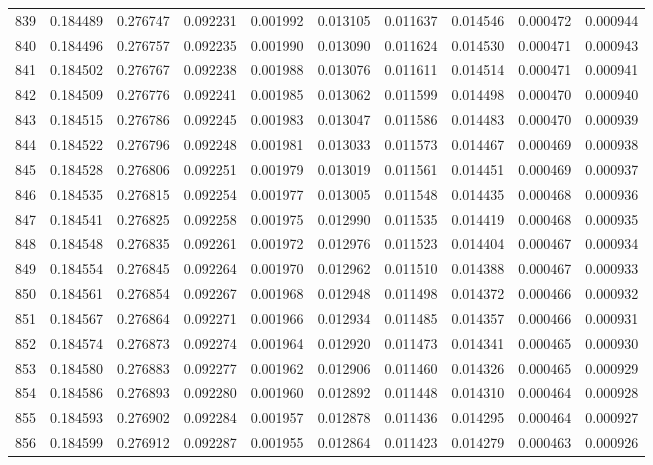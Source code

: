 \begin{tabular}{lrrrrrrrrr}
839 & 0.184489 & 0.276747 & 0.092231 & 0.001992 & 0.013105 & 0.011637 & 0.014546 & 0.000472 & 0.000944 \\
840 & 0.184496 & 0.276757 & 0.092235 & 0.001990 & 0.013090 & 0.011624 & 0.014530 & 0.000471 & 0.000943 \\
841 & 0.184502 & 0.276767 & 0.092238 & 0.001988 & 0.013076 & 0.011611 & 0.014514 & 0.000471 & 0.000941 \\
842 & 0.184509 & 0.276776 & 0.092241 & 0.001985 & 0.013062 & 0.011599 & 0.014498 & 0.000470 & 0.000940 \\
843 & 0.184515 & 0.276786 & 0.092245 & 0.001983 & 0.013047 & 0.011586 & 0.014483 & 0.000470 & 0.000939 \\
844 & 0.184522 & 0.276796 & 0.092248 & 0.001981 & 0.013033 & 0.011573 & 0.014467 & 0.000469 & 0.000938 \\
845 & 0.184528 & 0.276806 & 0.092251 & 0.001979 & 0.013019 & 0.011561 & 0.014451 & 0.000469 & 0.000937 \\
846 & 0.184535 & 0.276815 & 0.092254 & 0.001977 & 0.013005 & 0.011548 & 0.014435 & 0.000468 & 0.000936 \\
847 & 0.184541 & 0.276825 & 0.092258 & 0.001975 & 0.012990 & 0.011535 & 0.014419 & 0.000468 & 0.000935 \\
848 & 0.184548 & 0.276835 & 0.092261 & 0.001972 & 0.012976 & 0.011523 & 0.014404 & 0.000467 & 0.000934 \\
849 & 0.184554 & 0.276845 & 0.092264 & 0.001970 & 0.012962 & 0.011510 & 0.014388 & 0.000467 & 0.000933 \\
850 & 0.184561 & 0.276854 & 0.092267 & 0.001968 & 0.012948 & 0.011498 & 0.014372 & 0.000466 & 0.000932 \\
851 & 0.184567 & 0.276864 & 0.092271 & 0.001966 & 0.012934 & 0.011485 & 0.014357 & 0.000466 & 0.000931 \\
852 & 0.184574 & 0.276873 & 0.092274 & 0.001964 & 0.012920 & 0.011473 & 0.014341 & 0.000465 & 0.000930 \\
853 & 0.184580 & 0.276883 & 0.092277 & 0.001962 & 0.012906 & 0.011460 & 0.014326 & 0.000465 & 0.000929 \\
854 & 0.184586 & 0.276893 & 0.092280 & 0.001960 & 0.012892 & 0.011448 & 0.014310 & 0.000464 & 0.000928 \\
855 & 0.184593 & 0.276902 & 0.092284 & 0.001957 & 0.012878 & 0.011436 & 0.014295 & 0.000464 & 0.000927 \\
856 & 0.184599 & 0.276912 & 0.092287 & 0.001955 & 0.012864 & 0.011423 & 0.014279 & 0.000463 & 0.000926 \\

\end{tabular}
